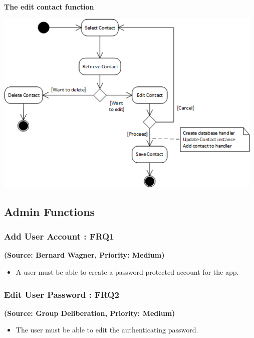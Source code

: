 \textbf{\\}
\begin{center}
\textbf{The edit contact function\\}
\end{center}
 \includegraphics[width=13cm]{diagrams/StateDiagrams/EditContactStateDiagram.png}

\normalsize
\vspace{12pt}

\subsection{Admin Functions}

\subsubsection{Add User Account : FRQ1}
\textbf{(Source: Bernard Wagner, Priority: Medium)}
\begin{itemize}
\item A user must be able to create a password protected account for the app.
\end{itemize}
\subsubsection{Edit User Password : FRQ2}
\textbf{(Source: Group Deliberation, Priority: Medium)}
\begin{itemize}
\item The user must be able to edit the authenticating password.
\end{itemize}
